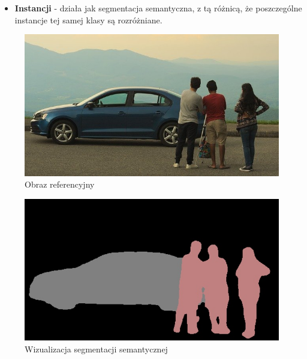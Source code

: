 \begin{description}
\begin{itemize}
        \item \textbf{Instancji} - działa jak segmentacja semantyczna, z tą różnicą, że poszczególne instancje tej samej klasy są rozróżniane.
        
    \end{itemize}

    \begin{figure}[h!]
    \begin{center}
        \includegraphics[scale=0.5]{img/car_people.jpg}
    \end{center}
    \caption{Obraz referencyjny\protect\footnotemark}
    \label{fig:ref_seg}
    \end{figure}
    
    
    \begin{figure}[h!]
    \begin{center}
        \includegraphics[scale=0.5]{img/car_people_sem.jpg}
    \end{center}
    \caption{Wizualizacja segmentacji semantycznej}
    \label{fig:seg_sem}
    \end{figure}
    

\end{description}
